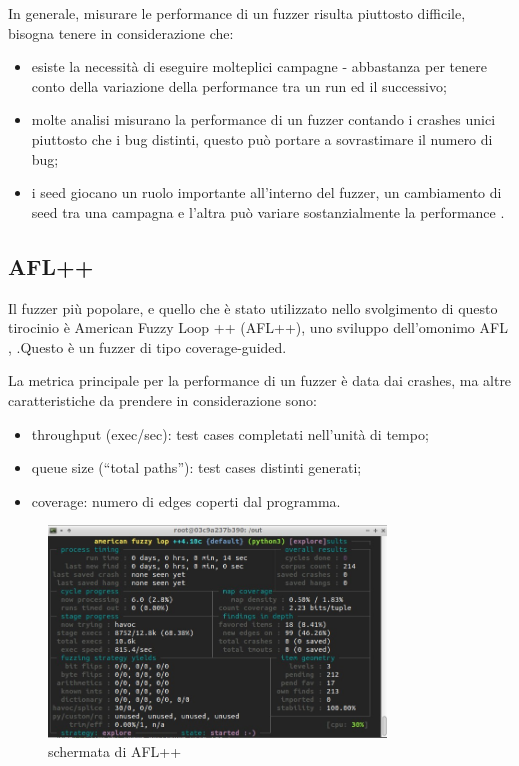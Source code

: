 In generale, misurare le performance di un fuzzer risulta piuttosto difficile, bisogna tenere in considerazione che:
\begin{itemize}
    \item esiste la necessità di eseguire molteplici campagne - abbastanza per tenere conto della variazione della performance tra un run ed il successivo;
    \item molte analisi misurano la performance di un fuzzer contando i crashes unici piuttosto che i bug distinti, questo può portare a sovrastimare il numero di bug;
    \item i seed giocano un ruolo importante all'interno del fuzzer, un cambiamento di seed tra una campagna e l'altra può variare sostanzialmente la performance \cite{ref21}. 
\end{itemize}

\subsection{AFL++}

Il fuzzer più popolare, e quello che è stato utilizzato nello svolgimento di questo tirocinio è American Fuzzy Loop ++ (AFL++), uno sviluppo dell’omonimo AFL \cite{ref11}, \cite{ref24}.Questo è un fuzzer di tipo coverage-guided. 

La metrica principale per la performance di un fuzzer è data dai crashes, ma altre caratteristiche da prendere in considerazione sono:
\begin{itemize}
    \item throughput (exec/sec): test cases completati nell’unità di tempo;
    \item queue size (“total paths”): test cases distinti generati;
    \item coverage: numero di edges coperti dal programma.
\end{itemize}

\begin{figure}[htbp]        
  \centering               
  \includegraphics[width=0.8\textwidth]{immagini/AFL++.jpg}  
  \caption{schermata di AFL++}  
  \label{fig:afl++}      
\end{figure}

